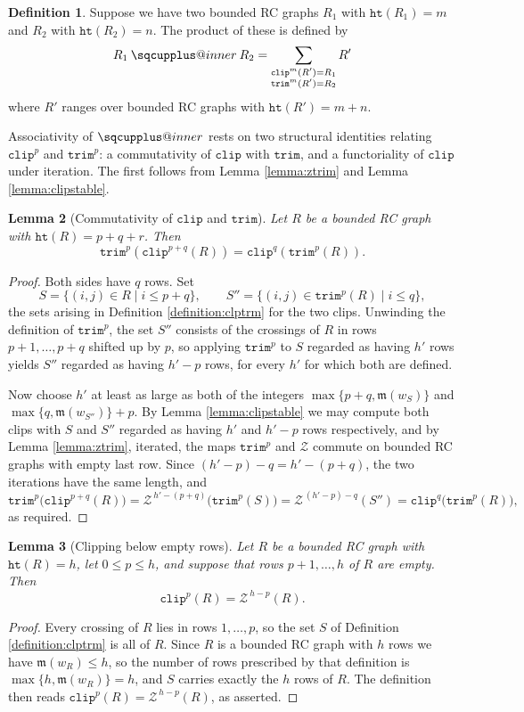 \documentclass{amsart}
\makeatletter
\newcommand{\sqcupplus@inner}[2]{%
  \vcenter{\hbox{\ooalign{%
    \hfil$\m@th#1\sqcup$\hfil\cr
    \hfil\raisebox{0.15ex}{$\m@th#1\scriptscriptstyle+$}\hfil\cr
  }}}%
}
\newcommand{\sqcupplus}{\mathbin{\mathpalette\sqcupplus@inner\relax}}
\newtheorem{lemma}{Lemma}[subsection]
\theoremstyle{definition}
\newtheorem{definition}[lemma]{Definition}
\theoremstyle{remark}
\numberwithin{equation}{subsection}
\newcommand{\wof}[1]{w_{#1}}
\newcommand{\trm}{\mathtt{trim}}
\newcommand{\zeromap}{\mathcal{Z}}
\newcommand{\hr}{\mathtt{ht}}
\newcommand{\clp}{\mathtt{clip}}
\newcommand{\maxd}{\mathfrak{m}}
\makeatother
\begin{document}
\begin{definition}\label{definition:ringproduct}
Suppose we have two bounded RC graphs $R_1$ with $\hr(R_1)=m$ and $R_2$ with $\hr(R_2)=n$. The product of these is defined by
$$R_1\sqcupplus R_2 = \sum_{\substack{\clp^m(R')=R_1\\\trm^m(R')=R_2}}R'$$  
where $R'$ ranges over bounded RC graphs with $\hr(R')=m+n$.
\end{definition}

Associativity of $\sqcupplus$ rests on two structural identities relating $\clp^p$ and $\trm^p$: a commutativity of $\clp$ with $\trm$, and a functoriality of $\clp$ under iteration. The first follows from Lemma \ref{lemma:ztrim} and Lemma \ref{lemma:clipstable}.

\begin{lemma}[Commutativity of $\clp$ and $\trm$] \label{lemma:clptrm}
Let $R$ be a bounded RC graph with $\hr(R)=p+q+r$. Then
$$\trm^p(\clp^{p+q}(R))=\clp^q(\trm^p(R)).$$
\end{lemma}
\begin{proof}
Both sides have $q$ rows. Set
$$S=\{(i,j)\in R\mid i\leq p+q\},\qquad S''=\{(i,j)\in \trm^p(R)\mid i\leq q\},$$
the sets arising in Definition \ref{definition:clptrm} for the two clips. Unwinding the definition of $\trm^p$, the set $S''$ consists of the crossings of $R$ in rows $p+1,\ldots,p+q$ shifted up by $p$, so applying $\trm^p$ to $S$ regarded as having $h'$ rows yields $S''$ regarded as having $h'-p$ rows, for every $h'$ for which both are defined.

Now choose $h'$ at least as large as both of the integers $\max\{p+q,\maxd(\wof S)\}$ and $\max\{q,\maxd(\wof{S''})\}+p$. By Lemma \ref{lemma:clipstable} we may compute both clips with $S$ and $S''$ regarded as having $h'$ and $h'-p$ rows respectively, and by Lemma \ref{lemma:ztrim}, iterated, the maps $\trm^p$ and $\zeromap$ commute on bounded RC graphs with empty last row. Since $(h'-p)-q=h'-(p+q)$, the two iterations have the same length, and
$$\trm^p\bigl(\clp^{p+q}(R)\bigr)=\zeromap^{\,h'-(p+q)}\bigl(\trm^p(S)\bigr)=\zeromap^{\,(h'-p)-q}(S'')=\clp^q\bigl(\trm^p(R)\bigr),$$
as required.
\end{proof}

\begin{lemma}[Clipping below empty rows]\label{lemma:clipempty}
Let $R$ be a bounded RC graph with $\hr(R)=h$, let $0\leq p\leq h$, and suppose that rows $p+1,\ldots,h$ of $R$ are empty. Then
$$\clp^p(R)=\zeromap^{\,h-p}(R).$$
\end{lemma}
\begin{proof}
Every crossing of $R$ lies in rows $1,\ldots,p$, so the set $S$ of Definition \ref{definition:clptrm} is all of $R$. Since $R$ is a bounded RC graph with $h$ rows we have $\maxd(\wof R)\leq h$, so the number of rows prescribed by that definition is $\max\{h,\maxd(\wof R)\}=h$, and $S$ carries exactly the $h$ rows of $R$. The definition then reads $\clp^p(R)=\zeromap^{\,h-p}(R)$, as asserted.
\end{proof}
\end{document}
